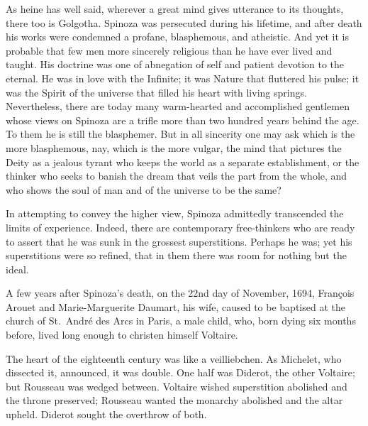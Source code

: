 \documentclass[]{book}
\begin{document}
As heine has well said, wherever a great mind gives utterance to its
thoughts, there too is Golgotha. Spinoza was persecuted during his
lifetime, and after death his works were condemned a profane,
blasphemous, and atheistic. And yet it is probable that few men more
sincerely religious than he have ever lived and taught. His doctrine was
one of abnegation of self and patient devotion to the eternal. He was in
love with the Infinite; it was Nature that fluttered his pulse; it was
the Spirit of the universe that filled his heart with living springs.
Nevertheless, there are today many warm-hearted and accomplished
gentlemen whose views on Spinoza are a trifle more than two hundred
years behind the age. To them he is still the blasphemer. But in all
sincerity one may ask which is the more blasphemous, nay, which is the
more vulgar, the mind that pictures the Deity as a jealous tyrant who
keeps the world as a separate establishment, or the thinker who seeks to
banish the dream that veils the part from the whole, and who shows the
soul of man and of the universe to be the same?

In attempting to convey the higher view, Spinoza admittedly transcended
the limits of experience. Indeed, there are contemporary free-thinkers
who are ready to assert that he was sunk in the grossest superstitions.
Perhaps he was; yet his superstitions were so refined, that in them
there was room for nothing but the ideal.

A few years after Spinoza's death, on the 22nd day of November, 1694,
François Arouet and Marie-Marguerite Daumart, his wife, caused to be
baptised at the church of St.~André des Arcs in Paris, a male child,
who, born dying six months before, lived long enough to christen himself
Voltaire.

The heart of the eighteenth century was like a veilliebchen. As
Michelet, who dissected it, announced, it was double. One half was
Diderot, the other Voltaire; but Rousseau was wedged between. Voltaire
wished superstition abolished and the throne preserved; Rousseau wanted
the monarchy abolished and the altar upheld. Diderot sought the
overthrow of both.
\end{document}
